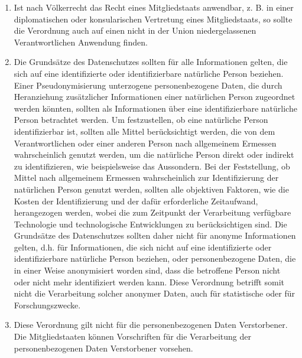 \begin{enumerate}

   \item Ist nach Völkerrecht das Recht eines Mitgliedstaats anwendbar, z. B. in einer diplomatischen oder
    konsularischen Vertretung eines Mitgliedstaats, so sollte die Verordnung auch auf einen nicht in der Union
    niedergelassenen Verantwortlichen Anwendung finden.%
   \label{eg:25}
   

   \item Die Grundsätze des Datenschutzes sollten für alle Informationen gelten, die sich auf eine identifizierte oder
    identifizierbare natürliche Person beziehen. Einer Pseudonymisierung unterzogene personenbezogene Daten, die durch
    Heranziehung zusätzlicher Informationen einer natürlichen Person zugeordnet werden könnten, sollten als
    Informationen über eine identifizierbare natürliche Person betrachtet werden. Um festzustellen, ob eine natürliche
    Person identifizierbar ist, sollten alle Mittel berücksichtigt werden, die von dem Verantwortlichen oder einer
    anderen Person nach allgemeinem Ermessen wahrscheinlich genutzt werden, um die natürliche Person direkt oder
    indirekt zu identifizieren, wie beispielsweise das Aussondern. Bei der Feststellung, ob Mittel nach allgemeinem
    Ermessen wahrscheinlich zur Identifizierung der natürlichen Person genutzt werden, sollten alle objektiven
    Faktoren, wie die Kosten der Identifizierung und der dafür erforderliche Zeitaufwand, herangezogen werden, wobei
    die zum Zeitpunkt der Verarbeitung verfügbare Technologie und technologische Entwicklungen zu berücksichtigen sind.
    Die Grundsätze des Datenschutzes sollten daher nicht für anonyme Informationen gelten, d.h. für Informationen, die
    sich nicht auf eine identifizierte oder identifizierbare natürliche Person beziehen, oder personenbezogene Daten,
    die in einer Weise anonymisiert worden sind, dass die betroffene Person nicht oder nicht mehr identifiziert werden
    kann. Diese Verordnung betrifft somit nicht die Verarbeitung solcher anonymer Daten, auch für statistische oder für
    Forschungszwecke.%
   \label{eg:26}
   

   \item Diese Verordnung gilt nicht für die personenbezogenen Daten Verstorbener. Die Mitgliedstaaten können
    Vorschriften für die Verarbeitung der personenbezogenen Daten Verstorbener vorsehen.%
   \label{eg:27}
   

\end{enumerate}
